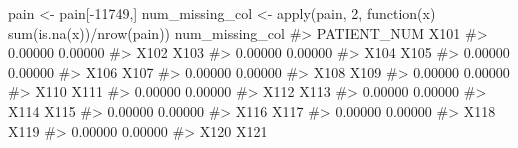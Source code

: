 \documentclass[
  letterpaper,
]{krantz}
\makeatletter
\newenvironment{Shaded}{\begin{snugshade}}{\end{snugshade}}
\newcommand{\CommentTok}[1]{\textcolor[rgb]{0.37,0.37,0.37}{#1}}
\newcommand{\ControlFlowTok}[1]{\textcolor[rgb]{0.00,0.23,0.31}{#1}}
\newcommand{\DecValTok}[1]{\textcolor[rgb]{0.68,0.00,0.00}{#1}}
\newcommand{\FunctionTok}[1]{\textcolor[rgb]{0.28,0.35,0.67}{#1}}
\newcommand{\NormalTok}[1]{\textcolor[rgb]{0.00,0.23,0.31}{#1}}
\newcommand{\OtherTok}[1]{\textcolor[rgb]{0.00,0.23,0.31}{#1}}
\newcommand{\SpecialCharTok}[1]{\textcolor[rgb]{0.37,0.37,0.37}{#1}}
\newenvironment{kframe}{%
\medskip{}
\setlength{\fboxsep}{.8em}
 \def\at@end@of@kframe{}%
 \ifinner\ifhmode%
  \def\at@end@of@kframe{\end{minipage}}%
  \begin{minipage}{\columnwidth}%
 \fi\fi%
 \def\FrameCommand##1{\hskip\@totalleftmargin \hskip-\fboxsep
 \colorbox{shadecolor}{##1}\hskip-\fboxsep
     \hskip-\linewidth \hskip-\@totalleftmargin \hskip\columnwidth}%
 \MakeFramed {\advance\hsize-\width
   \@totalleftmargin\z@ \linewidth\hsize
   \@setminipage}}%
 {\par\unskip\endMakeFramed%
 \at@end@of@kframe}
\renewenvironment{Shaded}{\begin{kframe}}{\end{kframe}}
\makeatother
\begin{document}
\begin{Shaded}
\begin{Highlighting}[]
\NormalTok{pain }\OtherTok{\textless{}{-}}\NormalTok{ pain[}\SpecialCharTok{{-}}\DecValTok{11749}\NormalTok{,]}
\NormalTok{num\_missing\_col }\OtherTok{\textless{}{-}} \FunctionTok{apply}\NormalTok{(pain, }\DecValTok{2}\NormalTok{, }
                         \ControlFlowTok{function}\NormalTok{(x) }\FunctionTok{sum}\NormalTok{(}\FunctionTok{is.na}\NormalTok{(x))}\SpecialCharTok{/}\FunctionTok{nrow}\NormalTok{(pain))}
\NormalTok{num\_missing\_col}
\CommentTok{\#\textgreater{}                      PATIENT\_NUM                             X101 }
\CommentTok{\#\textgreater{}                          0.00000                          0.00000 }
\CommentTok{\#\textgreater{}                             X102                             X103 }
\CommentTok{\#\textgreater{}                          0.00000                          0.00000 }
\CommentTok{\#\textgreater{}                             X104                             X105 }
\CommentTok{\#\textgreater{}                          0.00000                          0.00000 }
\CommentTok{\#\textgreater{}                             X106                             X107 }
\CommentTok{\#\textgreater{}                          0.00000                          0.00000 }
\CommentTok{\#\textgreater{}                             X108                             X109 }
\CommentTok{\#\textgreater{}                          0.00000                          0.00000 }
\CommentTok{\#\textgreater{}                             X110                             X111 }
\CommentTok{\#\textgreater{}                          0.00000                          0.00000 }
\CommentTok{\#\textgreater{}                             X112                             X113 }
\CommentTok{\#\textgreater{}                          0.00000                          0.00000 }
\CommentTok{\#\textgreater{}                             X114                             X115 }
\CommentTok{\#\textgreater{}                          0.00000                          0.00000 }
\CommentTok{\#\textgreater{}                             X116                             X117 }
\CommentTok{\#\textgreater{}                          0.00000                          0.00000 }
\CommentTok{\#\textgreater{}                             X118                             X119 }
\CommentTok{\#\textgreater{}                          0.00000                          0.00000 }
\CommentTok{\#\textgreater{}                             X120                             X121 }

\end{Highlighting}
\end{Shaded}
\end{document}
